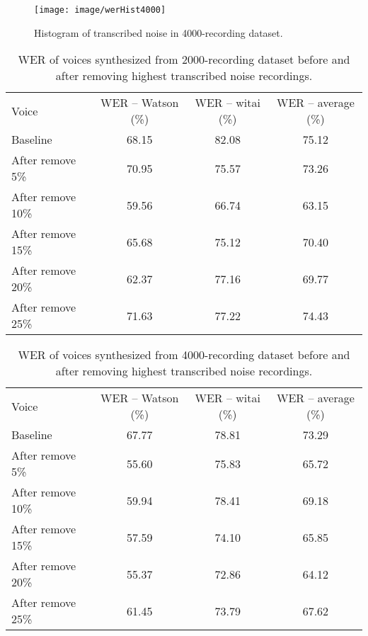 \documentclass[12pt]{article}
\begin{document}
\begin{figure}[t]
\begin{center}
\texttt{[image: image/werHist4000]}
\end{center}
\vspace{-0.3cm}
\caption[transcribed noise Hist 4000.]{Histogram of transcribed noise in 4000-recording dataset.}
\label{fig_transcribedNoiseHist4000}
\end{figure}

\begin{table}[]
\begin{center}
\caption{WER of voices synthesized from 2000-recording dataset before and after removing highest transcribed noise recordings.}
\label{tab_werTranscribedNoise2000}
\vspace{3mm}
\begin{tabular}{lccc}
\hline
Voice & WER – Watson (\%) & WER – witai (\%) & WER – average (\%)\\
\cmidrule(l{0pt}r{2pt}){1-1}\cmidrule(l{0pt}r{2pt}){2-2}\cmidrule(l{0pt}r{2pt}){3-3}\cmidrule(l{0pt}r{2pt}){4-4}
Baseline          & 68.15 & 82.08 & 75.12 \\
After remove 5\%  & 70.95 & 75.57 & 73.26 \\
After remove 10\% & 59.56 & 66.74 & 63.15 \\
After remove 15\% & 65.68 & 75.12 & 70.40 \\
After remove 20\% & 62.37 & 77.16 & 69.77 \\
After remove 25\% & 71.63 & 77.22 & 74.43 \\
\hline
\end{tabular}
\end{center}
\end{table}

\begin{table}[]
\begin{center}
\caption{WER of voices synthesized from 4000-recording dataset before and after removing highest transcribed noise recordings.}
\label{tab_werTranscribedNoise4000}
\vspace{3mm}
\begin{tabular}{lccc}
\hline
Voice & WER – Watson (\%) & WER – witai (\%) & WER – average (\%)\\
\cmidrule(l{0pt}r{2pt}){1-1}\cmidrule(l{0pt}r{2pt}){2-2}\cmidrule(l{0pt}r{2pt}){3-3}\cmidrule(l{0pt}r{2pt}){4-4}
Baseline          & 67.77 & 78.81 & 73.29 \\
After remove 5\%  & 55.60 & 75.83 & 65.72 \\
After remove 10\% & 59.94 & 78.41 & 69.18 \\
After remove 15\% & 57.59 & 74.10 & 65.85 \\
After remove 20\% & 55.37 & 72.86 & 64.12 \\
After remove 25\% & 61.45 & 73.79 & 67.62 \\
\hline
\end{tabular}
\end{center}
\end{table}
\end{document}

